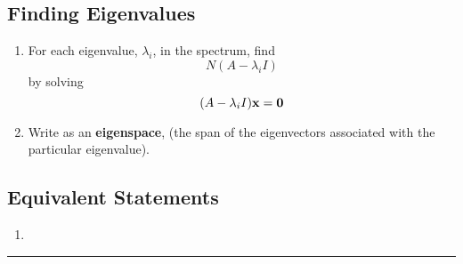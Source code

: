 \subsection{Finding Eigenvalues}
\begin{enumerate}
\item For each eigenvalue, $\lambda_i$, in the spectrum, find 
\[ N(A - \lambda_i I) \]
by solving 
\[  (A - \lambda_i I) {\bf x} = {\bf 0} \]


\item Write as an \textbf{eigenspace}, (the span of the eigenvectors associated with the particular eigenvalue).  

\end{enumerate}



\subsection{Equivalent Statements}
\begin{enumerate}
	\item 
\end{enumerate}



\rule[0.01in]{\textwidth}{0.0025in}




